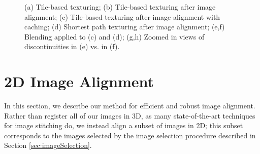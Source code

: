 \documentclass[]{spie}  %
\begin{document}
\begin{figure}
  \centering {}

  \caption{(a) Tile-based texturing; (b) Tile-based texturing after
    image alignment; (c) Tile-based texturing after image alignment
    with caching; (d) Shortest path texturing after image alignment;
    (e,f) Blending applied to (c) and (d); (g,h) Zoomed in views of
    discontinuities in (e) vs. in (f).}
  \label{fig:compareAll}
\end{figure}


\section{2D Image Alignment}
\label{sec:2dAlignment}
In this section, we describe our method for efficient and robust image
alignment. Rather than register all of our images in 3D, as many
state-of-the-art techniques for image stitching do, we instead align a
subset of images in 2D; this subset corresponds to the images selected
by the image selection procedure described in Section
\ref{sec:imageSelection}.
\end{document}
